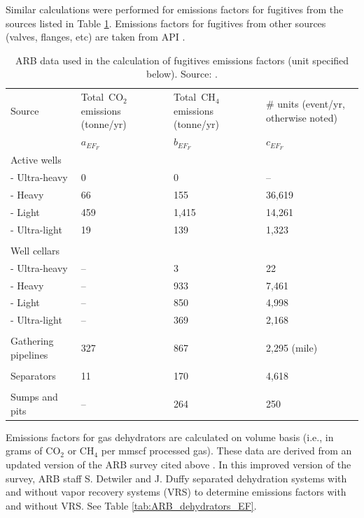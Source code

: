 \documentclass[11pt]{report}
\begin{document}
Similar calculations were performed for emissions factors for fugitives from the sources listed in Table \ref{tab:ARB_fugitives_EF}. Emissions factors for fugitives from other sources (valves, flanges, etc) are taken from API \cite[p. 20]{API1996b}. 
\begin{table}
\begin{scriptsize}
\caption{ARB data used in the calculation of fugitives emissions factors (unit specified below). Source: \cite{Lee2011}.}
\label{tab:ARB_fugitives_EF}
\begin{threeparttable}
\begin{tabular*}{0.9\columnwidth}{p{}p{}p{}p{}}
\toprule
Source & Total\,\,\,CO$_{2}$ \quad \quad emissions (tonne/yr) & Total\,\,\,CH$_{4}$ \quad\quad\quad emissions \quad\quad\quad (tonne/yr) & \# units (event/yr, otherwise noted) \\
& $a_{EF_F}$ & $b_{EF_F}$ & $c_{EF_F}$\\
\midrule
Active wells & & & \\
\quad - Ultra-heavy & 0 & 0 & -- \\
\quad - Heavy & 66 & 155 & 36,619 \\
\quad - Light & 459 & 1,415 & 14,261 \\
\quad - Ultra-light & 19 & 139 & 1,323 \\
\\
Well cellars & & & \\ 
\quad - Ultra-heavy & -- & 3 & 22 \\
\quad - Heavy & -- & 933 & 7,461 \\
\quad - Light & -- & 850 & 4,998 \\
\quad - Ultra-light & -- & 369 & 2,168 \\

\\
Gathering pipelines & 327 & 867 & 2,295 (mile) \\
\\
Separators & 11 & 170 & 4,618 \\
\\
Sumps and pits & -- & 264 & 250 \\
\bottomrule
\end{tabular*}
\end{threeparttable}
\end{scriptsize}
\end{table}

Emissions factors for gas dehydrators are calculated on volume basis (i.e., in grams of CO$_2$ or CH$_4$ per mmscf processed gas). These data are derived from an updated version of the ARB survey cited above \cite{ARB2013}. In this improved version of the survey, ARB staff S. Detwiler and J. Duffy separated dehydration systems with and without vapor recovery systems (VRS) to determine emissions factors with and without VRS. See Table \ref{tab:ARB_dehydrators_EF}.
\end{document}
